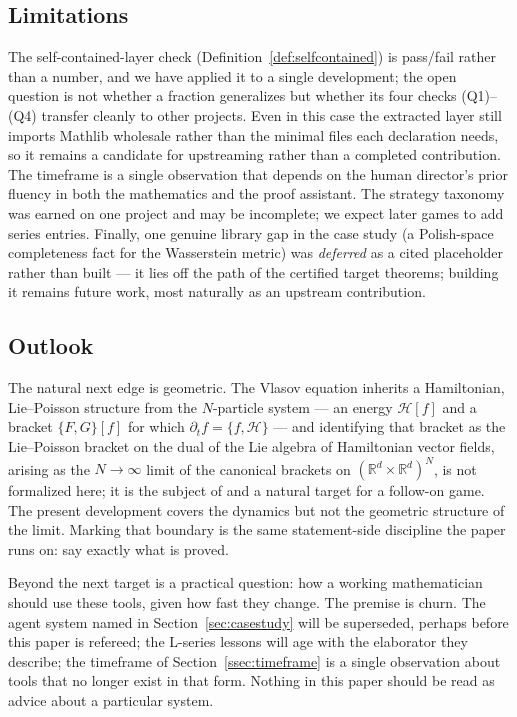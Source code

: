 \documentclass[11pt]{article}
\theoremstyle{plain}
\theoremstyle{definition}
\theoremstyle{remark}
\newcommand{\R}{\mathbb{R}}
\begin{document}
\subsection{Limitations}

The self-contained-layer check (Definition~\ref{def:selfcontained}) is pass/fail
rather than a number, and we have applied it to a single development;
the open question is not whether a fraction generalizes but whether its four
checks (Q1)--(Q4) transfer cleanly to other projects. Even in
this case the extracted layer still imports Mathlib wholesale rather than the
minimal files each declaration needs, so it remains a candidate for upstreaming
rather than a completed contribution. The
timeframe is a single observation that depends on the human director's prior fluency in both the mathematics and the
proof assistant. The strategy taxonomy was earned on one project and may be
incomplete; we expect later games to add series entries. Finally, one genuine
library gap in the case study (a Polish-space completeness fact for the
Wasserstein metric) was \emph{deferred} as a cited placeholder rather than built
--- it lies off the path of the certified target theorems; building it remains
future work, most naturally as an upstream contribution.

\subsection{Outlook}

The natural next edge is geometric. The Vlasov equation inherits a Hamiltonian,
Lie--Poisson structure from the $N$-particle system --- an energy $\mathcal{H}[f]$
and a bracket $\{F,G\}[f]$ for which $\partial_t f = \{f,\mathcal{H}\}$ --- and
identifying that bracket as the Lie--Poisson bracket on the dual of the Lie algebra
of Hamiltonian vector fields, arising as the $N\to\infty$ limit of the canonical
brackets on $(\R^d\times\R^d)^N$, is not formalized here; it is the subject of
\cite{MNPRS} and a natural target for a follow-on game. The present development
covers the dynamics but not the geometric structure of the limit. Marking that
boundary is the same statement-side discipline the paper runs on: say exactly what
is proved.

Beyond the next target is a practical question: how a working mathematician
should use these tools, given how fast they change. The premise is churn. The
agent system named in Section~\ref{sec:casestudy} will be superseded, perhaps
before this paper is refereed; the L-series lessons will age with the elaborator
they describe; the timeframe of Section~\ref{ssec:timeframe} is a single
observation about tools that no longer exist in that form. Nothing in this paper
should be read as advice about a particular system.
\end{document}
